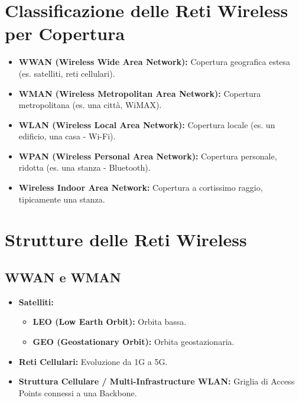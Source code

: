 \section{Classificazione delle Reti Wireless per Copertura}
\begin{itemize}
    \item \textbf{WWAN (Wireless Wide Area Network):} Copertura geografica estesa (es. satelliti, reti cellulari).
    \item \textbf{WMAN (Wireless Metropolitan Area Network):} Copertura metropolitana (es. una città, WiMAX).
    \item \textbf{WLAN (Wireless Local Area Network):} Copertura locale (es. un edificio, una casa - Wi-Fi).
    \item \textbf{WPAN (Wireless Personal Area Network):} Copertura personale, ridotta (es. una stanza - Bluetooth).
    \item \textbf{Wireless Indoor Area Network:} Copertura a cortissimo raggio, tipicamente una stanza.
\end{itemize}

\section{Strutture delle Reti Wireless}
\subsection{WWAN e WMAN}
\begin{itemize}
    \item \textbf{Satelliti:}
    \begin{itemize}
        \item \textbf{LEO (Low Earth Orbit):} Orbita bassa.
        \item \textbf{GEO (Geostationary Orbit):} Orbita geostazionaria.
    \end{itemize}
    \item \textbf{Reti Cellulari:} Evoluzione da 1G a 5G.
    \item \textbf{Struttura Cellulare / Multi-Infrastructure WLAN:} Griglia di Access Points connessi a una Backbone.
\end{itemize}
